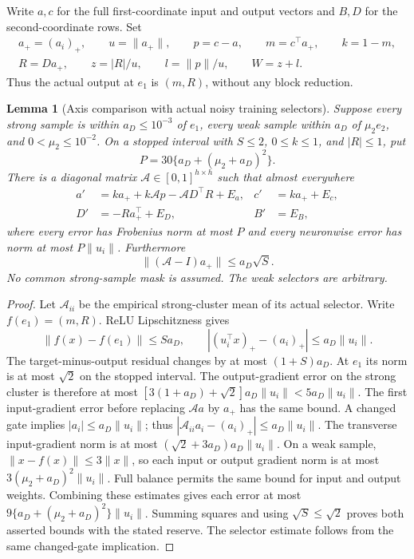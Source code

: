 \documentclass[11pt]{article}
\newtheorem{lemma}[theorem]{Lemma}
\theoremstyle{remark}
\begin{document}
Write $a,c$ for the full first-coordinate input and output vectors and
$B,D$ for the second-coordinate rows. Set
\begin{gather*}
 a_+=(a_i)_+,\qquad u=\|a_+\|,\qquad p=c-a,\qquad
 m=c^\top a_+,\qquad k=1-m,\\
 R=Da_+,\qquad z=|R|/u,\qquad l=\|p\|/u,\qquad W=z+l.
\end{gather*}
Thus the actual output at $e_1$ is $(m,R)$, without any block reduction.

\begin{lemma}[Axis comparison with actual noisy training selectors]
\label{sbwide:axis-system}
Suppose every strong sample is within $a_D\le10^{-3}$ of $e_1$, every
weak sample within $a_D$ of $\mu_2e_2$, and $0<\mu_2\le10^{-2}$.
On a stopped interval with $S\le2$, $0\le k\le1$, and $|R|\le1$, put
\[
 P=30\{a_D+(\mu_2+a_D)^2\}.
\]
There is a diagonal matrix $\mathcal A\in[0,1]^{h\times h}$ such that
almost everywhere
\begin{align}\label{sbwide:perturbed-axis}
 a'&=ka_++k\mathcal A p-\mathcal A D^\top R+E_a,
 &c'&=ka_++E_c,\\
 D'&=-Ra_+^\top+E_D,
 &B'&=E_B,\nonumber
\end{align}
where every error has Frobenius norm at most $P$ and every neuronwise
error has norm at most $P\|u_i\|$. Furthermore
\[
 \|(\mathcal A-I)a_+\|\le a_D\sqrt S.
\]
No common strong-sample mask is assumed. The weak selectors are arbitrary.
\end{lemma}
\begin{proof}
Let $\mathcal A_{ii}$ be the empirical strong-cluster mean of its actual
selector. Write $f(e_1)=(m,R)$. ReLU Lipschitzness gives
\[
 \|f(x)-f(e_1)\|\le Sa_D,\qquad
 |(u_i^\top x)_+-(a_i)_+|\le a_D\|u_i\|.
\]
The target-minus-output residual changes by at most $(1+S)a_D$.
At $e_1$ its norm is at most $\sqrt2$ on the stopped interval.
The output-gradient error on the strong cluster is therefore at most
$[3(1+a_D)+\sqrt2]a_D\|u_i\|<5a_D\|u_i\|$.
The first input-gradient error before replacing $\mathcal A a$ by $a_+$
has the same bound. A changed gate implies $|a_i|\le a_D\|u_i\|$;
thus $|\mathcal A_{ii}a_i-(a_i)_+|\le a_D\|u_i\|$.
The transverse input-gradient norm is at most
$(\sqrt2+3a_D)a_D\|u_i\|$.
On a weak sample, $\|x-f(x)\|\le3\|x\|$, so each input or output
gradient norm is at most $3(\mu_2+a_D)^2\|u_i\|$.
Full balance permits the same bound for input and output weights.
Combining these estimates gives each error at most
$9\{a_D+(\mu_2+a_D)^2\}\|u_i\|$.
Summing squares and using $\sqrt S\le\sqrt2$ proves both asserted
bounds with the stated reserve. The selector estimate follows from the
same changed-gate implication.
\end{proof}
\end{document}

